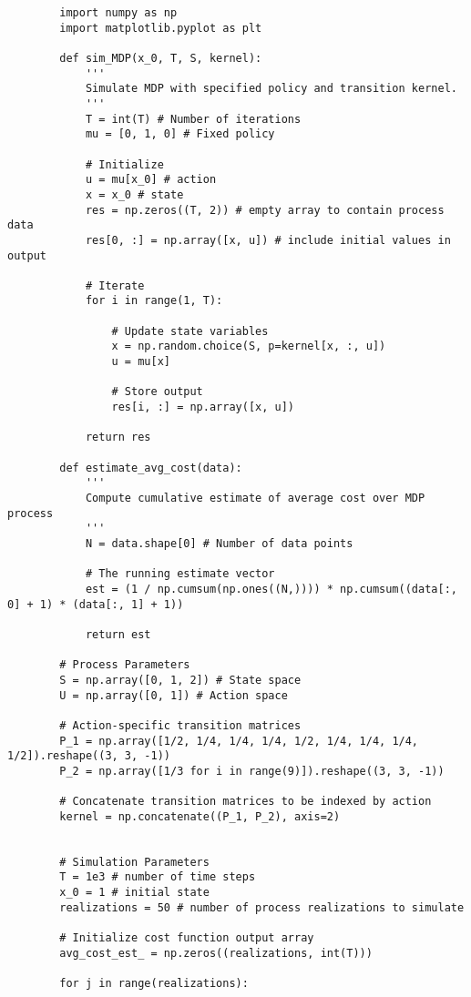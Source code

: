 \documentclass[11pt, letterpaper]{article}
\begin{document}
    \begin{verbatim}
        import numpy as np
        import matplotlib.pyplot as plt

        def sim_MDP(x_0, T, S, kernel):
            '''
            Simulate MDP with specified policy and transition kernel.
            '''
            T = int(T) # Number of iterations
            mu = [0, 1, 0] # Fixed policy

            # Initialize
            u = mu[x_0] # action
            x = x_0 # state
            res = np.zeros((T, 2)) # empty array to contain process data
            res[0, :] = np.array([x, u]) # include initial values in output

            # Iterate
            for i in range(1, T):

                # Update state variables
                x = np.random.choice(S, p=kernel[x, :, u])
                u = mu[x]

                # Store output
                res[i, :] = np.array([x, u])

            return res

        def estimate_avg_cost(data):
            '''
            Compute cumulative estimate of average cost over MDP process
            '''
            N = data.shape[0] # Number of data points

            # The running estimate vector
            est = (1 / np.cumsum(np.ones((N,)))) * np.cumsum((data[:, 0] + 1) * (data[:, 1] + 1))

            return est

        # Process Parameters
        S = np.array([0, 1, 2]) # State space
        U = np.array([0, 1]) # Action space

        # Action-specific transition matrices
        P_1 = np.array([1/2, 1/4, 1/4, 1/4, 1/2, 1/4, 1/4, 1/4, 1/2]).reshape((3, 3, -1))
        P_2 = np.array([1/3 for i in range(9)]).reshape((3, 3, -1))

        # Concatenate transition matrices to be indexed by action
        kernel = np.concatenate((P_1, P_2), axis=2)


        # Simulation Parameters
        T = 1e3 # number of time steps
        x_0 = 1 # initial state
        realizations = 50 # number of process realizations to simulate

        # Initialize cost function output array
        avg_cost_est_ = np.zeros((realizations, int(T)))

        for j in range(realizations):
            

\end{verbatim}
\end{document}
